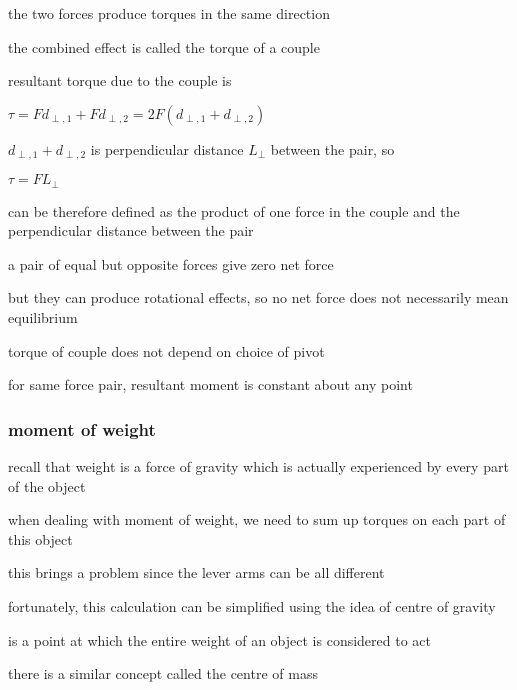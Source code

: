 the two forces produce torques in the same direction

the combined effect is called the torque of a couple



resultant torque due to the couple is

{
	\centering
	
	$ \tau = Fd_{\perp,1} + Fd_{\perp,2} = 2F(d_{\perp,1} + d_{\perp,2}) $
	
}

$d_{\perp,1} + d_{\perp,2}$ is perpendicular distance $L_\perp$ between the pair, so

{
	\centering
	
	$ \boxed{\tau = F L_\perp} $
	
}

\begin{ilight}
	 can be therefore defined as the product of one force in the couple and the perpendicular distance between the pair
\end{ilight}

\cmt a pair of equal but opposite forces give zero net force

but they can produce rotational effects, so no net force does not necessarily mean equilibrium

\cmt torque of couple does not depend on choice of pivot

for same force pair, resultant moment is constant about any point



\subsubsection{moment of weight}

recall that weight is a force of gravity which is actually experienced by every part of the object

when dealing with moment of weight, we need to sum up torques on each part of this object

this brings a problem since the lever arms can be all different

fortunately, this calculation can be simplified using the idea of centre of gravity

\begin{ilight}
	 is a point at which the entire weight of an object is considered to act
\end{ilight}

\cmt there is a similar concept called the centre of mass

